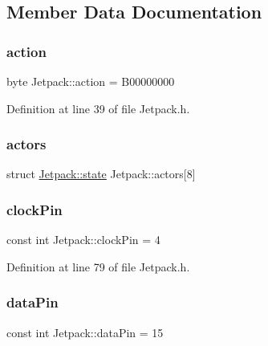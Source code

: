 \subsection{Member Data Documentation}
\mbox{\label{class_jetpack_aca3142925a7b0834b34ae91d26af7765}} 
\subsubsection{\texorpdfstring{action}{action}}
{\footnotesize\ttfamily byte Jetpack\+::action = B00000000\hspace{0.3cm}{\ttfamily [private]}}



Definition at line 39 of file Jetpack.\+h.

\mbox{\label{class_jetpack_a7e16d2f97837f9712a2e6de1c50d99db}} 
\subsubsection{\texorpdfstring{actors}{actors}}
{\footnotesize\ttfamily struct \hyperlink{struct_jetpack_1_1state}{Jetpack\+::state} Jetpack\+::actors\mbox{[}8\mbox{]}\hspace{0.3cm}{\ttfamily [private]}}

\mbox{\label{class_jetpack_a58ebb991f358f3ae94e82148b0221b5a}} 
\subsubsection{\texorpdfstring{clock\+Pin}{clockPin}}
{\footnotesize\ttfamily const int Jetpack\+::clock\+Pin = 4\hspace{0.3cm}{\ttfamily [private]}}



Definition at line 79 of file Jetpack.\+h.

\mbox{\label{class_jetpack_a3d669a56e93c71dd25f970d4ed7d0c00}} 
\subsubsection{\texorpdfstring{data\+Pin}{dataPin}}
{\footnotesize\ttfamily const int Jetpack\+::data\+Pin = 15\hspace{0.3cm}{\ttfamily [private]}}



